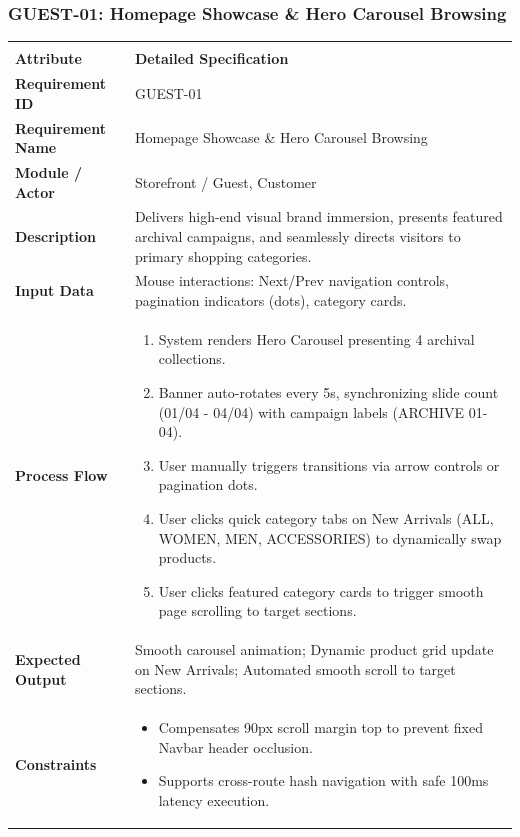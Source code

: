 \documentclass[12pt,a4paper,oneside]{report}
\begin{document}
\subsubsection{GUEST-01: Homepage Showcase \& Hero Carousel Browsing}
\begin{longtable}{|p{3.6cm}|p{11.9cm}|}
\hline
\rowcolor{PrimaryBrown}
\multicolumn{2}{|p{15.5cm}|}{\textbf{\textcolor{white}{Functional Specification: GUEST-01 -- Homepage Showcase \& Hero Carousel Browsing}}} \\
\hline
\endfirsthead
\hline
\rowcolor{PrimaryBrown}
\multicolumn{2}{|p{15.5cm}|}{\textbf{\textcolor{white}{Functional Specification: GUEST-01 (Continued)}}} \\
\hline
\textbf{Attribute} & \textbf{Detailed Specification} \\
\hline
\endhead
\hline
\endfoot
\textbf{Requirement ID} & GUEST-01 \\
\hline
\textbf{Requirement Name} & Homepage Showcase \& Hero Carousel Browsing \\
\hline
\textbf{Module / Actor} & Storefront / Guest, Customer \\
\hline
\textbf{Description} & Delivers high-end visual brand immersion, presents featured archival campaigns, and seamlessly directs visitors to primary shopping categories. \\
\hline
\textbf{Input Data} & Mouse interactions: Next/Prev navigation controls, pagination indicators (dots), category cards. \\
\hline
\textbf{Process Flow} & \begin{enumerate}[leftmargin=*,nosep,topsep=2pt]
  \item System renders Hero Carousel presenting 4 archival collections.
  \item Banner auto-rotates every 5s, synchronizing slide count (01/04 - 04/04) with campaign labels (ARCHIVE 01-04).
  \item User manually triggers transitions via arrow controls or pagination dots.
  \item User clicks quick category tabs on New Arrivals (ALL, WOMEN, MEN, ACCESSORIES) to dynamically swap products.
  \item User clicks featured category cards to trigger smooth page scrolling to target sections.
\end{enumerate} \\
\hline
\textbf{Expected Output} & Smooth carousel animation; Dynamic product grid update on New Arrivals; Automated smooth scroll to target sections. \\
\hline
\textbf{Constraints} & \begin{itemize}[leftmargin=*,nosep,topsep=2pt]
  \item Compensates 90px scroll margin top to prevent fixed Navbar header occlusion.
  \item Supports cross-route hash navigation with safe 100ms latency execution.
\end{itemize} \\
\hline
\end{longtable}
\end{document}
